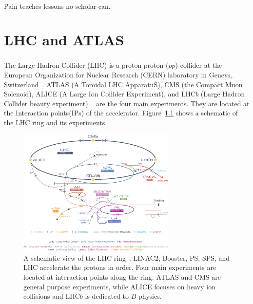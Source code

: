 \begin{savequote}[75mm]
Pain teaches lessons no scholar can.
\end{savequote}

\chapter{LHC and ATLAS}
\paragraph{}
The Large Hadron Collider (LHC) is a proton-proton ($pp$) collider at the European Organization for Nuclear Research (CERN) laboratory in Geneva, Switzerland~\cite{LHCPaper}.  ATLAS (A Toroidal LHC ApparatuS), CMS (the Compact Muon Solenoid), ALICE (A Large Ion Collider Experiment), and LHC$b$ (Large Hadron Collider beauty experiment) ~\cite{ATLASPaper, CMSPaper, LHCbPaper, ALICEPaper} are the four main experiments. They are located at the Interaction points(IPs) of the accelerator. Figure~\ref{fig:LHC} shows a schematic of the LHC ring and its experiments. 

\begin{figure}[h!]
  \centering
  \captionsetup{justification=centering}
  \includegraphics[width=0.7\textwidth]{figures/detector/Cern-Accelerator-Complex.jpg}
   \caption{A schematic view of the LHC ring~\cite{LHCReview}. LINAC2, Booster, PS, SPS, and LHC accelerate the protons in order. Four main experiments are located at interaction points along the ring. ATLAS and CMS are general purpose experiments, while ALICE focuses on heavy ion collisions and LHC$b$ is dedicated to $B$ physics.}
  \label{fig:LHC}
\end{figure}

